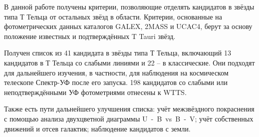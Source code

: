 В данной работе получены критерии, позволяющие отделять кандидатов в звёзды типа Т Тельца от остальных звёзд в области. Критерии, основанные на фотометрических данных каталогов GALEX, 2MASS и UCAC4, берут за основу положение известных и подтверждённых T Tauri звёзд.

Получен список из 41 кандидата в звёзды типа Т Тельца, включающий 13 кандидатов в Т Тельца со слабыми линиями и 22 -- в классические. Они подходят для дальнейшего изучения, в частности, для наблюдения на космическом телескопе Спектр-УФ после его запуска. 198 кандидатов со слабыми или неподтверждёнными УФ фотометриями отнесены к WTTS. 

Также есть пути дальнейшего улучшения списка: учёт межзвёздного покраснения с помощью анализа двухцветной диаграммы U~-~B~vs~B~-~V; учёт собственных движений и отсев галактик; наблюдение кандидатов с земли.